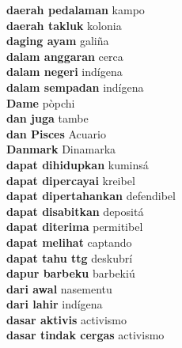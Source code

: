 \textbf{ daerah pedalaman  } kampo \\
\textbf{ daerah takluk  } kolonia \\
\textbf{ daging ayam  } galiña \\
\textbf{ dalam anggaran  } cerca \\
\textbf{ dalam negeri  } indígena \\
\textbf{ dalam sempadan  } indígena \\
\textbf{ Dame  } pòpchi \\
\textbf{ dan juga  } tambe \\
\textbf{ dan Pisces  } Acuario \\
\textbf{ Danmark  } Dinamarka \\
\textbf{ dapat dihidupkan  } kuminsá \\
\textbf{ dapat dipercayai  } kreibel \\
\textbf{ dapat dipertahankan  } defendibel \\
\textbf{ dapat disabitkan  } depositá \\
\textbf{ dapat diterima  } permitibel \\
\textbf{ dapat melihat  } captando \\
\textbf{ dapat tahu ttg  } deskubrí \\
\textbf{ dapur barbeku  } barbekiú \\
\textbf{ dari awal  } nasementu \\
\textbf{ dari lahir  } indígena \\
\textbf{ dasar aktivis  } activismo \\
\textbf{ dasar tindak cergas  } activismo \\
